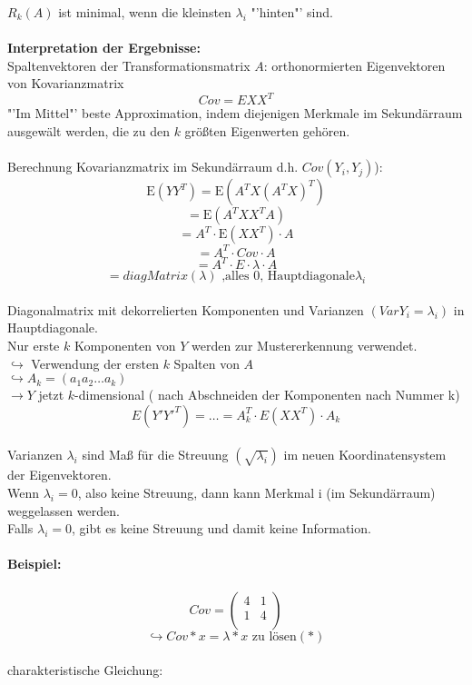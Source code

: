 \documentclass[a4paper,12pt]{scrreprt}
\newcommand{\Nb}[1]{\textbf{#1}}
\begin{document}
$R_k(A)$ ist minimal, wenn die kleinsten $\lambda_i$ "'hinten"' sind.\\
\\
\Nb{Interpretation der Ergebnisse:}\\
Spaltenvektoren der Transformationsmatrix $A$: orthonormierten Eigenvektoren von Kovarianzmatrix\\
$$Cov=E XX^T$$
"'Im Mittel"' beste Approximation, indem diejenigen Merkmale im Sekundärraum ausgewält werden, die zu den $k$ größten Eigenwerten gehören.\\
\\
Berechnung Kovarianzmatrix im Sekundärraum d.h. $Cov(Y_i,Y_j)$):\\
$$\text{E}(YY^T)=\text{E}(A^TX(A^TX)^T)$$
$$=\text{E}(A^TXX^TA)$$
$$=A^T\cdot \text{E}(XX^T)\cdot A$$
$$= A^T\cdot Cov\cdot A$$
$$=A^T\cdot E\cdot\lambda\cdot A$$
$$=diagMatrix(\lambda) \text{ ,alles 0, Hauptdiagonale} \lambda_i $$
\\
Diagonalmatrix mit dekorrelierten Komponenten und Varianzen $(Var Y_i = \lambda_i)$ in Hauptdiagonale.\\
Nur erste $k$ Komponenten von $Y$ werden zur Mustererkennung verwendet.\\
$\hookrightarrow$ Verwendung der ersten $k$ Spalten von $A$\\
$\hookrightarrow A_k=(a_1 a_2 \dots a_k)$\\
$\rightarrow Y$ jetzt $k$-dimensional ( nach Abschneiden der Komponenten nach Nummer k)\\
$$E(Y'Y'^T)= \dots =A^T_k\cdot E(XX^T)\cdot A_k$$\\
Varianzen $\lambda_i$ sind Maß für die Streuung $(\sqrt{\lambda_i})$ im neuen Koordinatensystem der Eigenvektoren.\\
Wenn $\lambda_i = 0$, also keine Streuung, dann kann Merkmal i (im Sekundärraum) weggelassen werden.\\
Falls $\lambda_i = 0$, gibt es keine Streuung und damit keine Information.\\
\\
\Nb{Beispiel:}\\
\\
$$ Cov = \begin{pmatrix}
         4 & 1 \\
         1 & 4 \\
        \end{pmatrix} $$
$$ \hookrightarrow Cov * x = \lambda * x \text{ zu lösen} (*) $$\\
charakteristische Gleichung:
\end{document}

